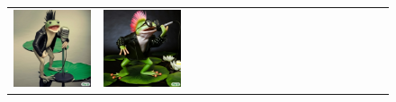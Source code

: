 \begin{figure}[ht!]
\begin{adjustwidth}{-0.8in}{-0.5in}
\begin{tabular}{cccccccccccccccccccc}
\multicolumn{2}{c}{\includegraphics[width=\threebythreecolwidth\textwidth]{figures/cherries/rock_frog_1.jpg}} &
\multicolumn{2}{c}{\includegraphics[width=\threebythreecolwidth\textwidth]{figures/cherries/rock_frog_2.jpg}} &&


\end{tabular}
\end{adjustwidth}
\end{figure}
